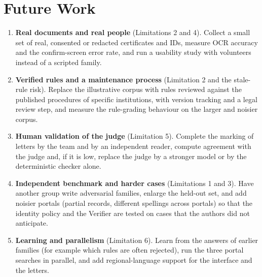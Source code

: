 \documentclass[12pt,a4paper,oneside]{report}
\begin{document}
\section{Future Work}
\begin{enumerate}[leftmargin=*,itemsep=3pt]
\item \textbf{Real documents and real people} (Limitations 2 and 4). Collect a small set of real, consented or redacted certificates and IDs, measure OCR accuracy and the confirm-screen error rate, and run a usability study with volunteers instead of a scripted family.
\item \textbf{Verified rules and a maintenance process} (Limitation 2 and the stale-rule risk). Replace the illustrative corpus with rules reviewed against the published procedures of specific institutions, with version tracking and a legal review step, and measure the rule-grading behaviour on the larger and noisier corpus.
\item \textbf{Human validation of the judge} (Limitation 5). Complete the marking of letters by the team and by an independent reader, compute agreement with the judge and, if it is low, replace the judge by a stronger model or by the deterministic checker alone.
\item \textbf{Independent benchmark and harder cases} (Limitations 1 and 3). Have another group write adversarial families, enlarge the held-out set, and add noisier portals (partial records, different spellings across portals) so that the identity policy and the Verifier are tested on cases that the authors did not anticipate.
\item \textbf{Learning and parallelism} (Limitation 6). Learn from the answers of earlier families (for example which rules are often rejected), run the three portal searches in parallel, and add regional-language support for the interface and the letters.
\end{enumerate}
\end{document}
